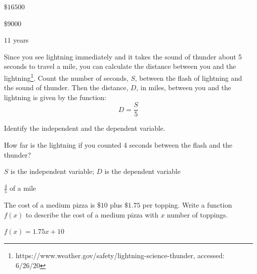 \begin{solution}

\begin{parts}
\item $\$16500$
\item $\$9000$
\item $11$ years
\end{parts}
\end{solution}







\begin{exercise}
Since you see lightning immediately and it takes the sound of thunder about 5 seconds to travel a mile, you can calculate the distance between you and the lightning\footnote{https://www.weather.gov/safety/lightning-science-thunder, accessed: 6/26/20}. Count the number of seconds, $S$, between the flash of lightning and the sound of thunder. Then the distance, $D$, in miles, between you and the lightning is given by the function:
\[D=\frac{S}{5}\]


\begin{parts}
\item Identify the independent and the dependent variable.

\item How far is the lightning if you counted 4 seconds between the flash and the thunder?
\end{parts}
\end{exercise}

\begin{solution}

\begin{parts}
\item $S$ is the independent variable; $D$ is the dependent variable
\item $\frac{4}{5}$ of a mile
\end{parts}
\end{solution}







\begin{exercise}
The cost of a medium pizza is $\$10$ plus $\$1.75$ per topping. Write a function $f(x)$ to describe the cost of a medium pizza with $x$ number of toppings.
\end{exercise}

\begin{solution}
$f(x)=1.75x+10$
\end{solution}







